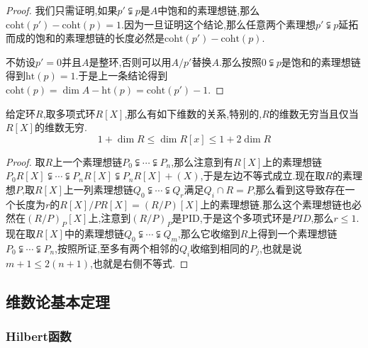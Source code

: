 \begin{enumerate}
\begin{proof}
		我们只需证明,如果$p'\subsetneqq p$是$A$中饱和的素理想链,那么$\mathrm{coht}(p')-\mathrm{coht}(p)=1$.因为一旦证明这个结论,那么任意两个素理想$p'\subsetneqq p$延拓而成的饱和的素理想链的长度必然是$\mathrm{coht}(p')-\mathrm{coht}(p)$.
		
		不妨设$p'=0$并且$A$是整环,否则可以用$A/p'$替换$A$.那么按照$0\subsetneqq p$是饱和的素理想链得到$\mathrm{ht}(p)=1$.于是上一条结论得到$\mathrm{coht}(p)=\dim A-\mathrm{ht}(p)=\mathrm{coht}(p')-1$.
	\end{proof}
\end{enumerate}

给定环$R$,取多项式环$R[X]$,那么有如下维数的关系,特别的,$R$的维数无穷当且仅当$R[X]$的维数无穷.
$$1+\dim R\le\dim R[x]\le 1+2\dim R$$
\begin{proof}
	
	取$R$上一个素理想链$P_0\subsetneqq\cdots\subsetneqq P_n$,那么注意到有$R[X]$上的素理想链$P_0R[X]\subsetneqq\cdots\subsetneqq P_nR[X]\subsetneqq P_nR[X]+(X)$,于是左边不等式成立.现在取$R$的素理想$P$,取$R[X]$上一列素理想链$Q_0\subsetneqq\cdots\subsetneqq Q_r$满足$Q_i\cap R=P$,那么看到这导致存在一个长度为$r$的$R[X]/PR[X]= (R/P)[X]$上的素理想链.那么这个素理想链也必然在$(R/P)_P[X]$上,注意到$(R/P)_P$是PID,于是这个多项式环是$PID$,那么$r\le1$.现在取$R[X]$中的素理想链$Q_0\subsetneqq\cdots\subsetneqq Q_m$,那么它收缩到$R$上得到一个素理想链$P_0\subsetneqq\cdots\subsetneqq P_n$,按照所证,至多有两个相邻的$Q_i$收缩到相同的$P_j$,也就是说$m+1\le 2(n+1)$,也就是右侧不等式.
\end{proof}
\newpage
\subsection{维数论基本定理}
\subsubsection{Hilbert函数}

